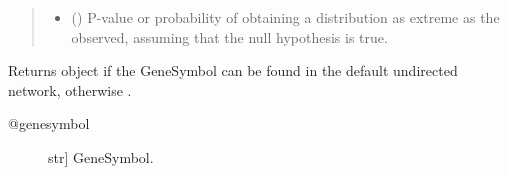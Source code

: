\documentclass[letterpaper,10pt,english]{sphinxmanual}
\begin{document}
\begin{fulllineitems}
\begin{fulllineitems}
\begin{quote}
\begin{description}
\begin{itemize}
\item {} 
() \textendash{} P-value or probability of obtaining a
distribution as extreme as the observed, assuming that the
null hypothesis is true.

\end{itemize}


\end{description}\end{quote}

\end{fulllineitems}


\begin{fulllineitems}
\label{\detokenize{main:pypath.main.PyPath.geneset_enrichment}}
\end{fulllineitems}


\begin{fulllineitems}
\label{\detokenize{main:pypath.main.PyPath.genesymbol}}
Returns  object if the GeneSymbol
can be found in the default undirected network,
otherwise .
\begin{description}
\item[{@genesymbol}] \leavevmode{[}str{]}
GeneSymbol.

\end{description}

\end{fulllineitems}



\end{fulllineitems}
\end{document}
